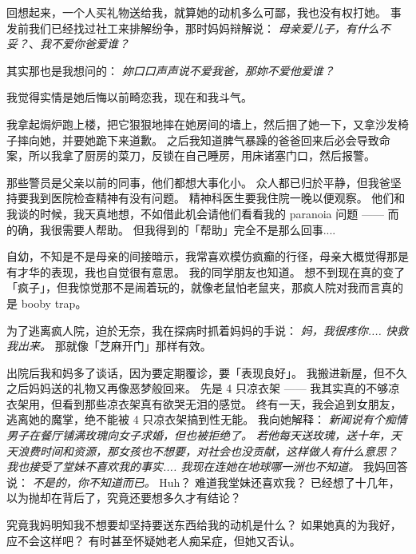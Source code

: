\documentclass[12pt]{report}
\newcommand{\cc}[2]{#1}
\newcommand{\cc}[2]{#2}
\newcommand{\speechCn}[1]{\textrm{\textit{\textcolor{Speech}{#1}}}}
\begin{document}
\cc{
回想起来，一个人买礼物送给我，就算她的动机多么可鄙，我也没有权打她。 事发前我们已经找过社工来排解纷争，那时妈妈辩解说： \speechCn{母亲爱儿子，有什么不妥？}、\speechCn{我不爱你爸爱谁？}
}{
	
}

\cc{
其实那也是我想问的： \speechCn{妳口口声声说不爱我爸，那妳不爱他爱谁？}
}{
	
}

\cc{
我觉得实情是她后悔以前畸恋我，现在和我斗气。
}{
	
}

\cc{
我拿起焗炉跑上楼，把它狠狠地摔在她房间的墙上，然后掴了她一下，又拿沙发椅子摔向她，并要她跪下来道歉。 之后我知道脾气暴躁的爸爸回来后必会导致命案，所以我拿了厨房的菜刀，反锁在自己睡房，用床诸塞门口，然后报警。
}{
	
}

\cc{
那些警员是父亲以前的同事，他们都想大事化小。 众人都已归於平静，但我爸坚持要我到医院检查精神有没有问题。 精神科医生要我住院一晚以便观察。 他们和我谈的时候，我天真地想，不如借此机会请他们看看我的 paranoia 问题 —— 而的确，我很需要人帮助。 但我得到的「帮助」完全不是那么回事....
}{
	
}

\cc{
自幼，不知是不是母亲的间接暗示，我常喜欢模仿疯癫的行径，母亲大概觉得那是有才华的表现，我也自觉很有意思。 我的同学朋友也知道。 想不到现在真的变了「疯子」，但我惊觉那不是闹着玩的，就像老鼠怕老鼠夹，那疯人院对我而言真的是 booby trap。
}{
	
}

\cc{
为了逃离疯人院，迫於无奈，我在探病时抓着妈妈的手说： \speechCn{妈，我很疼你.... 快救我出来。}  那就像「芝麻开门」那样有效。
}{
	
}

\cc{
出院后我和妈多了谈话，因为要定期覆诊，要「表现良好」。 我搬进新屋，但不久之后妈妈送的礼物又再像恶梦般回来。 先是 4 只凉衣架 —— 我其实真的不够凉衣架用，但看到那些凉衣架真有欲哭无泪的感觉。 终有一天，我会追到女朋友，逃离她的魔掌，绝不能被 4 只凉衣架搞到性无能。 我向她解释： \speechCn{新闻说有个痴情男子在餐厅铺满玫瑰向女子求婚，但也被拒绝了。 若他每天送玫瑰，送十年，天天浪费时间和资源，那女孩也不想要，对社会也没贡献，这样做人有什么意思？ 我也接受了堂妹不喜欢我的事实.... 我现在连她在地球哪一洲也不知道。}  我妈回答说： \speechCn{不是的，你不知道而已。}  Huh？ 难道我堂妹还喜欢我？ 已经想了十几年，以为抛却在背后了，究竟还要想多久才有结论？
}{
	
}

\cc{
究竟我妈明知我不想要却坚持要送东西给我的动机是什么？ 如果她真的为我好，应不会这样吧？ 有时甚至怀疑她老人痴呆症，但她又否认。
}{
	
}
\end{document}
